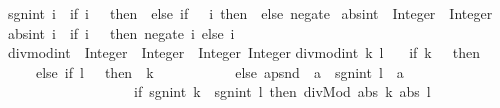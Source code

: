 \begin{isabellebody}
\begin{isamarkuptext}
sgn{}int\ i\ {}\ {}if\ i\ {}{}\ {}\ then\ {}\ else\ {}if\ {}\ {}\ i\ then\ {}\ else\ negate\ {}{}{}{}\isanewline
\isanewline
abs{}int\ {}{}\ Integer\ {}{}\ Integer{}\isanewline
abs{}int\ i\ {}\ {}if\ i\ {}\ {}\ then\ negate\ i\ else\ i{}{}\isanewline
\isanewline
divmod{}int\ {}{}\ Integer\ {}{}\ Integer\ {}{}\ {}Integer{}\ Integer{}{}\isanewline
divmod{}int\ k\ l\ {}\isanewline
\ \ {}if\ k\ {}{}\ {}\ then\ {}{}{}\ {}{}\isanewline
\ \ \ \ else\ {}if\ l\ {}{}\ {}\ then\ {}{}{}\ k{}\isanewline
\ \ \ \ \ \ \ \ \ \ \ else\ apsnd\ {}{}\ a\ {}{}\ sgn{}int\ l\ {}\ a{}\isanewline
\ \ \ \ \ \ \ \ \ \ \ \ \ \ \ \ \ \ {}if\ sgn{}int\ k\ {}{}\ sgn{}int\ l\ then\ divMod\ {}abs\ k{}\ {}abs\ l{}\isanewline

\end{isamarkuptext}
\end{isabellebody}
